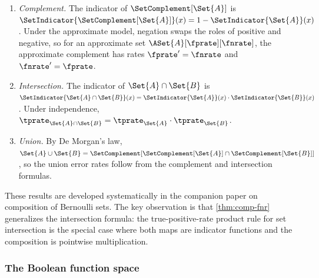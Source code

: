 \documentclass[ ../main.tex]{subfiles}
\begin{document}
\begin{enumerate}
\item \emph{Complement.}
The indicator of $\SetComplement[\Set{A}]$ is
$\SetIndicator{\SetComplement[\Set{A}]}(x) = 1 -
\SetIndicator{\Set{A}}(x)$.
Under the approximate model, negation swaps the roles of positive and
negative, so for an approximate set $\ASet{A}[\fprate][\fnrate]$, the
approximate complement has rates $\fprate' = \fnrate$ and
$\fnrate' = \fprate$.

\item \emph{Intersection.}
The indicator of $\Set{A} \cap \Set{B}$ is
$\SetIndicator{\Set{A} \cap \Set{B}}(x) =
\SetIndicator{\Set{A}}(x) \cdot \SetIndicator{\Set{B}}(x)$.
Under independence,
$\tprate_{\Set{A} \cap \Set{B}} = \tprate_{\Set{A}} \cdot
\tprate_{\Set{B}}$.

\item \emph{Union.}
By De Morgan's law,
$\Set{A} \cup \Set{B} =
\SetComplement[\SetComplement[\Set{A}] \cap
\SetComplement[\Set{B}]]$,
so the union error rates follow from the complement and intersection
formulas.
\end{enumerate}

These results are developed systematically in the companion paper on
composition of Bernoulli sets.  The key observation is that
\cref{thm:comp-fnr} generalizes the intersection formula: the
true-positive-rate product rule for set intersection is the special
case where both maps are indicator functions and the composition is
pointwise multiplication.

\subsubsection{The Boolean function space}
\end{document}
